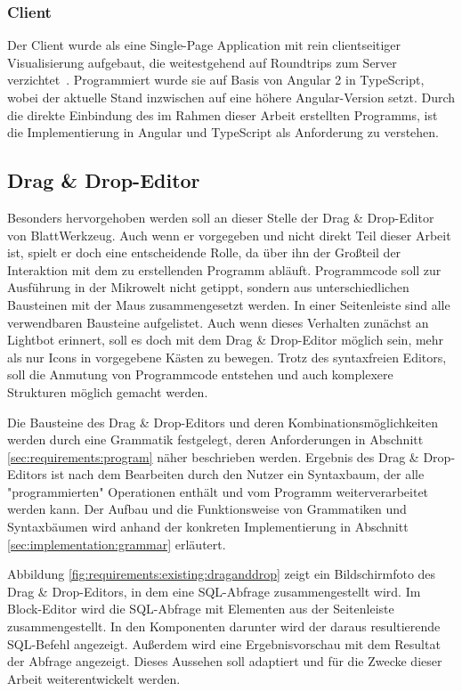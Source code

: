 \subsubsection{Client}

Der Client wurde als eine Single-Page Application mit rein clientseitiger Visualisierung aufgebaut, die weitestgehend auf Roundtrips zum Server verzichtet~\cite[94-95]{riemer2016}. Programmiert wurde sie auf Basis von Angular 2 in TypeScript, wobei der aktuelle Stand inzwischen auf eine höhere Angular-Version setzt. Durch die direkte Einbindung des im Rahmen dieser Arbeit erstellten Programms, ist die Implementierung in Angular und TypeScript als Anforderung zu verstehen.

\subsection{Drag \& Drop-Editor}
\label{sec:requirements:existing:structure:drag-drop}

Besonders hervorgehoben werden soll an dieser Stelle der Drag \& Drop-Editor von BlattWerkzeug. Auch wenn er vorgegeben und nicht direkt Teil dieser Arbeit ist, spielt er doch eine entscheidende Rolle, da über ihn der Großteil der Interaktion mit dem zu erstellenden Programm abläuft. Programmcode soll zur Ausführung in der Mikrowelt nicht getippt, sondern aus unterschiedlichen Bausteinen mit der Maus zusammengesetzt werden. In einer Seitenleiste sind alle verwendbaren Bausteine aufgelistet. Auch wenn dieses Verhalten zunächst an Lightbot erinnert, soll es doch mit dem Drag \& Drop-Editor möglich sein, mehr als nur Icons in vorgegebene Kästen zu bewegen. Trotz des syntaxfreien Editors, soll die Anmutung von Programmcode entstehen und auch komplexere Strukturen möglich gemacht werden.

Die Bausteine des Drag \& Drop-Editors und deren Kombinationsmöglichkeiten werden durch eine Grammatik festgelegt, deren Anforderungen in Abschnitt \ref{sec:requirements:program} näher beschrieben werden. Ergebnis des Drag \& Drop-Editors ist nach dem Bearbeiten durch den Nutzer ein Syntaxbaum, der alle "programmierten" Operationen enthält und vom Programm weiterverarbeitet werden kann. Der Aufbau und die Funktionsweise von Grammatiken und Syntaxbäumen wird anhand der konkreten Implementierung in Abschnitt \ref{sec:implementation:grammar} erläutert.

Abbildung \ref{fig:requirements:existing:draganddrop} zeigt ein Bildschirmfoto des Drag \& Drop-Editors, in dem eine SQL-Abfrage zusammengestellt wird. Im Block-Editor wird die SQL-Abfrage mit Elementen aus der Seitenleiste zusammengestellt. In den Komponenten darunter wird der daraus resultierende SQL-Befehl angezeigt. Außerdem wird eine Ergebnisvorschau mit dem Resultat der Abfrage angezeigt. Dieses Aussehen soll adaptiert und für die Zwecke dieser Arbeit weiterentwickelt werden.

